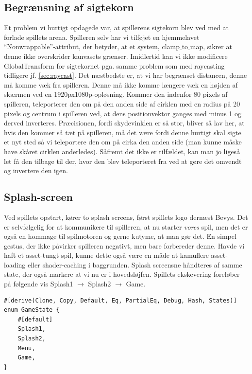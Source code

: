 \subsection{Begrænsning af sigtekorn}
Et problem vi hurtigt opdagede var, at spillerens sigtekorn blev ved med at forlade spillets arena. Spilleren selv har vi tilføjet en hjemmelavet ``Nonwrappable''-attribut, der betyder, at et system, clamp$\_$to$\_$map, sikrer at denne ikke overskrider kanvasets grænser. Imidlertid kan vi ikke modificere GlobalTransform for sigtekornet pga. samme problem som med raycasting tidligere jf. \autoref{sec:raycast}. Det næstbedste er, at vi har begrænset distancen, denne må komme væk fra spilleren. Denne må ikke komme længere væk en højden af skærmen ved en 1920px1080p-opløsning. Kommer den indenfor 80 pixels af spilleren, teleporterer den om på den anden side af cirklen med en radius på 20 pixels og centrum i spilleren ved, at dens positionvektor ganges med minus 1 og derved inverteres. Præcisionen, fordi skydevinklen er så stor, bliver så lav her, at hvis den kommer så tæt på spilleren, må det være fordi denne hurtigt skal sigte et nyt sted så vi teleportere den om på cirka den anden side (man kunne måske have skåret cirklen anderledes). Såfremt det ikke er tilfældet, kan man jo ligeså let få den tilbage til der, hvor den blev teleporteret fra ved at gøre det omvendt og invertere den igen.


\subsection{Splash-screen}
Ved spillets opstart, kører to splash screens, først spillets logo dernæst Bevys. Det er selvfølgelig for at kommunikere til spilleren, at nu starter \textit{vores} spil, men det er også en hommage til spilmotoren og gerne kutyme, at man gør det. En simpel gestus, der ikke påvirker spilleren negativt, men bare forbereder denne. Havde vi haft et asset-tungt spil, kunne dette også være en måde at kamuflere asset-loading eller shader-caching i baggrunden. Splash screensne håndteres af samme state, der også markere at vi nu er i hovedsløjfen. Spillets ekskevering foreløber på følgende vis Splash1 $\rightarrow$ Splash2 $\rightarrow$ Game.

\begin{verbatim}
#[derive(Clone, Copy, Default, Eq, PartialEq, Debug, Hash, States)]
enum GameState {
    #[default]
    Splash1,
    Splash2,
    Menu,
    Game,
}
\end{verbatim}

